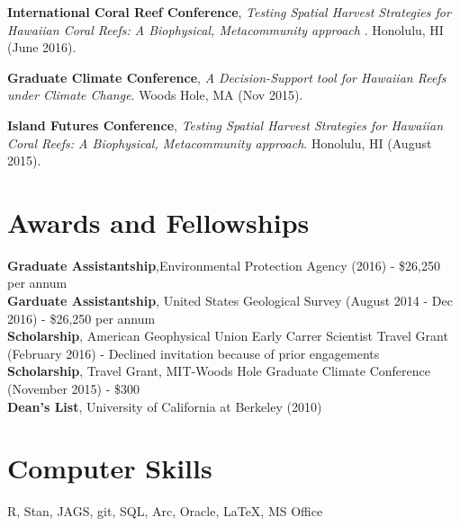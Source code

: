 \documentclass[10pt, letterpaper]{article}
\begin{document}
\noindent \textbf{International Coral Reef Conference}, \textit{Testing Spatial Harvest Strategies for Hawaiian Coral Reefs: A Biophysical, Metacommunity approach }. Honolulu, HI (June 2016).

\noindent \textbf{Graduate Climate Conference}, \textit{A Decision-Support tool for Hawaiian Reefs under Climate Change}. Woods Hole, MA (Nov 2015).

\noindent \textbf{Island Futures Conference}, \textit{Testing Spatial Harvest Strategies for Hawaiian Coral Reefs: A Biophysical, Metacommunity approach}. Honolulu, HI (August 2015).

\section*{Awards and Fellowships}
\textbf{Graduate Assistantship},Environmental Protection Agency (2016) - \$26,250 per annum \\
\textbf{Garduate Assistantship}, United States Geological Survey (August 2014 - Dec 2016) - \$26,250 per annum \\
\textbf{Scholarship}, American Geophysical Union Early Carrer Scientist Travel Grant (February 2016) - Declined invitation because of prior engagements \\
\textbf{Scholarship}, Travel Grant, MIT-Woods Hole Graduate Climate Conference (November 2015) - \$300 \\
\textbf{Dean's List}, University of California at Berkeley (2010) \\

\section*{Computer Skills}
 R, Stan, JAGS, git, SQL, Arc, Oracle, \LaTeX, MS Office
\end{document}
